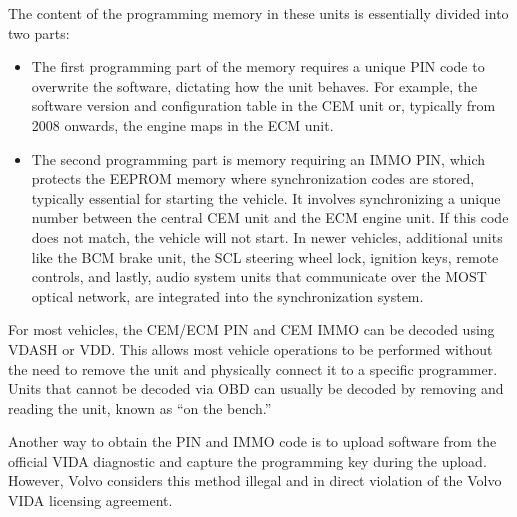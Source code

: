 \documentclass[letterpaper,10pt,english]{sphinxmanual}
\begin{document}
\sphinxAtStartPar
The content of the programming memory in these units is essentially divided into two parts:
\begin{itemize}
\item {} 
\sphinxAtStartPar
The first programming part of the memory requires a unique PIN code to overwrite the software, dictating how the unit behaves. For example, the software version and configuration table in the CEM unit or, typically from 2008 onwards, the engine maps in the ECM unit.

\item {} 
\sphinxAtStartPar
The second programming part is memory requiring an IMMO PIN, which protects the EEPROM memory where synchronization codes are stored, typically essential for starting the vehicle. It involves synchronizing a unique number between the central CEM unit and the ECM engine unit. If this code does not match, the vehicle will not start. In newer vehicles, additional units like the BCM brake unit, the SCL steering wheel lock, ignition keys, remote controls, and lastly, audio system units that communicate over the MOST optical network, are integrated into the synchronization system.

\end{itemize}

\sphinxAtStartPar
For most vehicles, the CEM/ECM PIN and CEM IMMO can be decoded using VDASH or VDD. This allows most vehicle operations to be performed without the need to remove the unit and physically connect it to a specific programmer. Units that cannot be decoded via OBD can usually be decoded by removing and reading the unit, known as “on the bench.”

\sphinxAtStartPar
Another way to obtain the PIN and IMMO code is to upload software from the official VIDA diagnostic and capture the programming key during the upload. However, Volvo considers this method illegal and in direct violation of the Volvo VIDA licensing agreement.
\end{document}
